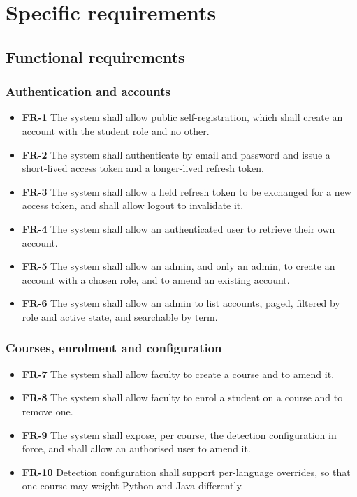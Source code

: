 \hypertarget{specific-requirements}{%
\section{Specific requirements}\label{specific-requirements}}

\hypertarget{functional-requirements}{%
\subsection{Functional requirements}\label{functional-requirements}}

\hypertarget{authentication-and-accounts}{%
\subsubsection{Authentication and
accounts}\label{authentication-and-accounts}}

\begin{itemize}
\tightlist
\item
  \textbf{FR-1} The system shall allow public self-registration, which
  shall create an account with the student role and no other.
\item
  \textbf{FR-2} The system shall authenticate by email and password and
  issue a short-lived access token and a longer-lived refresh token.
\item
  \textbf{FR-3} The system shall allow a held refresh token to be
  exchanged for a new access token, and shall allow logout to invalidate
  it.
\item
  \textbf{FR-4} The system shall allow an authenticated user to retrieve
  their own account.
\item
  \textbf{FR-5} The system shall allow an admin, and only an admin, to
  create an account with a chosen role, and to amend an existing
  account.
\item
  \textbf{FR-6} The system shall allow an admin to list accounts, paged,
  filtered by role and active state, and searchable by term.
\end{itemize}

\hypertarget{courses-enrolment-and-configuration}{%
\subsubsection{Courses, enrolment and
configuration}\label{courses-enrolment-and-configuration}}

\begin{itemize}
\tightlist
\item
  \textbf{FR-7} The system shall allow faculty to create a course and to
  amend it.
\item
  \textbf{FR-8} The system shall allow faculty to enrol a student on a
  course and to remove one.
\item
  \textbf{FR-9} The system shall expose, per course, the detection
  configuration in force, and shall allow an authorised user to amend
  it.
\item
  \textbf{FR-10} Detection configuration shall support per-language
  overrides, so that one course may weight Python and Java differently.
\end{itemize}

